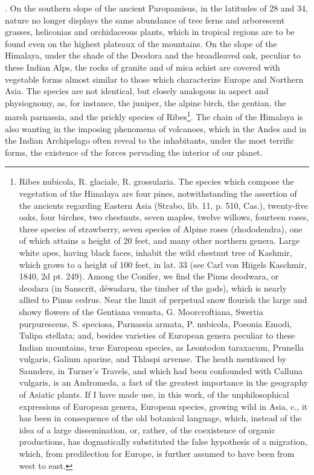{}. On the southern slope of the ancient Paropamisus, in the latitudes of 28 and 34, nature no longer displays the same abundance of tree ferns and arborescent grasses, heliconias and orchidaceous plants, which in tropical regions are to be found even on the highest plateaux of the mountains. On the slope of the Himalaya, under the shade of the Deodora and the broadleaved oak, peculiar to these Indian Alps, the rocks of granite and of mica schist are covered with vegetable forms almost similar to those which characterize Europe and Northern Asia. The species are not identical, but closely analogous in aspect and physiognomy, as, for instance, the juniper, the alpine birch, the gentian, the marsh parnassia, and the prickly species of Ribes\footnote{Ribes nubicola, R. glaciale, R. grossularia. The species which compose the vegetation of the Himalaya are four pines, notwithstanding the assertion of the ancients regarding Eastern Asia (Strabo, lib. 11, p. 510, Cas.), twenty-five oaks, four birches, two chestnuts, seven maples, twelve willows, fourteen roses, three species of strawberry, seven species of Alpine roses (rhododendra), one of which attains a height of 20 feet, and many other northern genera. Large white apes, having black faces, inhabit the wild chestnut tree of Kashmir, which grows to a height of 100 feet, in lat. 33 (see Carl von Hiigels Kaschmir, 1840, 2d pt. 249). Among the Conifer, we find the Pinus deodwara, or deodara (in Sanscrit, d\'{e}wadaru, the timber of the gods), which is nearly allied to Pinus cedrus. Near the limit of perpetual snow flourish the large and showy flowers of the Gentiana venusta, G. Moorcroftiana, Swertia purpurescens, S. speciosa, Parnassia armata, P. nubicola, Poeonia Emodi, Tulipa stellata; and, besides varieties of European genera peculiar to these Indian mountains, true European species, as Leontodon taraxacum, Prunella vulgaris, Galium aparine, and Thlaspi arvense. The heath mentioned by Saunders, in Turner's Travels, and which had been confounded with Calluna vulgaris, is an Andromeda, a fact of the greatest importance in the geography of Asiatic plants. If I have made use, in this work, of the unphilosophical expressions of European genera, European species, growing wild in Asia, c., it has been in consequence of the old botanical language, which, instead of the idea of a large dissemination, or, rather, of the coexistence of organic productions, has dogmatically substituted the false hypothesis of a migration, which, from predilection for Europe, is further assumed to have been from west to east.}. The chain of the Himalaya is also wanting in the imposing phenomena of volcanoes, which in the Andes and in the Indian Archipelago often reveal to the inhabitants, under the most terrific forms, the existence of the forces pervading the interior of our planet.

